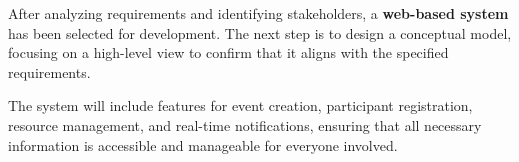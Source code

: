After analyzing requirements and identifying stakeholders, a \textbf{web-based system} has been selected for development. The next step is to design a conceptual model, focusing on a high-level view to confirm that it aligns with the specified requirements.

The system will include features for event creation, participant registration, resource management, and real-time notifications, ensuring that all necessary information is accessible and manageable for everyone involved.






 
